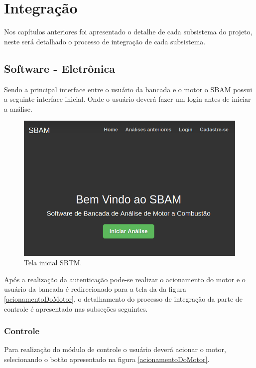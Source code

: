 \chapter{Integração}

Nos capítulos anteriores foi apresentado o detalhe de cada subsistema do projeto, neste será detalhado o processo de integração de cada subsistema.

\section{Software - Eletrônica}

Sendo a principal interface entre o usuário da bancada e o motor o SBAM possui a seguinte interface inicial.
Onde o usuário deverá fazer um login antes de iniciar a	 análise. 

\begin{figure}[h!]
	\centering
	\includegraphics[keepaspectratio=true,scale= 0.7]{figuras/SBTM-TelaInicial.png}
	\caption{Tela inicial SBTM.}
	\label{telainicialSbtm}
\end{figure}

Após a realização da autenticação pode-se realizar o acionamento do motor e o usuário da bancada é redirecionado para a tela da da figura \ref{acionamentoDoMotor}, o detalhamento do processo de integração da parte de controle é apresentado nas subseções seguintes.

\subsection{Controle}

Para realização do módulo de controle o usuário deverá acionar o motor, selecionando o botão apresentado na figura \ref{acionamentoDoMotor}.

